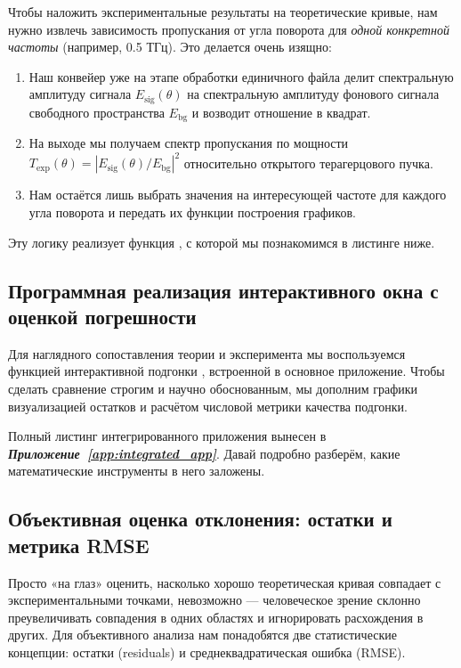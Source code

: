 Чтобы наложить экспериментальные результаты на теоретические кривые, нам нужно извлечь зависимость пропускания от угла поворота для \textit{одной конкретной частоты} (например, 0.5 ТГц). Это делается очень изящно:
\begin{enumerate}
    \item Наш конвейер  уже на этапе обработки единичного файла делит спектральную амплитуду сигнала $E_{\text{sig}}(\theta)$ на спектральную амплитуду фонового сигнала свободного пространства $E_{\text{bg}}$ и возводит отношение в квадрат.
    \item На выходе мы получаем спектр пропускания по мощности $T_{\text{exp}}(\theta) = \left| E_{\text{sig}}(\theta) / E_{\text{bg}} \right|^2$ относительно открытого терагерцового пучка.
    \item Нам остаётся лишь выбрать значения на интересующей частоте для каждого угла поворота и передать их функции построения графиков.
\end{enumerate}
Эту логику реализует функция , с которой мы познакомимся в листинге ниже.

\subsection{Программная реализация интерактивного окна с оценкой погрешности}

Для наглядного сопоставления теории и эксперимента мы воспользуемся функцией интерактивной подгонки , встроенной в основное приложение. Чтобы сделать сравнение строгим и научно обоснованным, мы дополним графики визуализацией остатков и расчётом числовой метрики качества подгонки.

Полный листинг интегрированного приложения  вынесен в \textbf{\textit{Приложение~\ref{app:integrated_app}}}. Давай подробно разберём, какие математические инструменты в него заложены.

\subsection{Объективная оценка отклонения: остатки и метрика RMSE}

Просто «на глаз» оценить, насколько хорошо теоретическая кривая совпадает с экспериментальными точками, невозможно — человеческое зрение склонно преувеличивать совпадения в одних областях и игнорировать расхождения в других. Для объективного анализа нам понадобятся две статистические концепции: остатки (residuals) и среднеквадратическая ошибка (RMSE).

